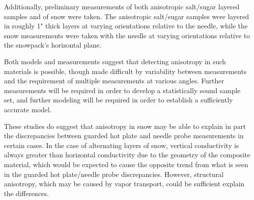 \documentclass{article}
\begin{document}
Additionally, preliminary measurements of both anisotropic salt/sugar
layered samples and of snow were taken. The anisotropic salt/sugar samples were
layered in roughly 1" thick layers at varying orientations relative to the
needle, while the snow measurements were taken with the needle at varying
orientations relative to the snowpack's horizontal plane.

Both models and measurements suggest that detecting anisotropy
in such materials is possible, though made difficult by variability between
measurements and the requirement of multiple measurements at various angles.
Further measurements will be required in order to develop a statistically sound
sample set, and further modeling will be required in order to establish a
sufficiently accurate model.

These studies do suggest that anisotropy in snow may be able to explain in part
the discrepancies between guarded hot plate and needle probe measurements in 
certain cases. In the case of alternating layers of snow, vertical conductivity
is always greater than horizontal conductivity due to the geometry of the
composite material, which would be expected to cause the opposite trend from
what is seen in the guarded hot plate/needle probe discrepancies.
\cite{lunardini} However, structural anisotropy, which may be caused by vapor
transport, could be sufficient explain the differences.



\end{document}
